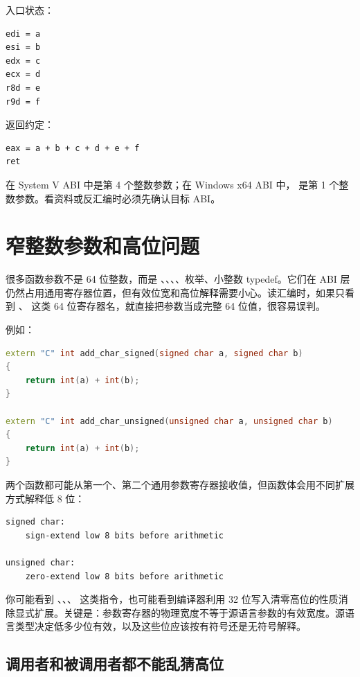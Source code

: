 入口状态：

\begin{lstlisting}
edi = a
esi = b
edx = c
ecx = d
r8d = e
r9d = f
\end{lstlisting}

返回约定：

\begin{lstlisting}
eax = a + b + c + d + e + f
ret
\end{lstlisting}

\begin{warningbox}
 在 System V ABI 中是第 4 个整数参数；在 Windows x64 ABI 中， 是第 1 个整数参数。看资料或反汇编时必须先确认目标 ABI。
\end{warningbox}

\section{窄整数参数和高位问题}

很多函数参数不是 64 位整数，而是 、、、、枚举、小整数 typedef。它们在 ABI 层仍然占用通用寄存器位置，但有效位宽和高位解释需要小心。读汇编时，如果只看到 、 这类 64 位寄存器名，就直接把参数当成完整 64 位值，很容易误判。

例如：

\begin{lstlisting}[language=C++]
extern "C" int add_char_signed(signed char a, signed char b)
{
    return int(a) + int(b);
}

extern "C" int add_char_unsigned(unsigned char a, unsigned char b)
{
    return int(a) + int(b);
}
\end{lstlisting}

两个函数都可能从第一个、第二个通用参数寄存器接收值，但函数体会用不同扩展方式解释低 8 位：

\begin{lstlisting}
signed char:
    sign-extend low 8 bits before arithmetic

unsigned char:
    zero-extend low 8 bits before arithmetic
\end{lstlisting}

你可能看到 、、、 这类指令，也可能看到编译器利用 32 位写入清零高位的性质消除显式扩展。关键是：参数寄存器的物理宽度不等于源语言参数的有效宽度。源语言类型决定低多少位有效，以及这些位应该按有符号还是无符号解释。

\subsection{调用者和被调用者都不能乱猜高位}

